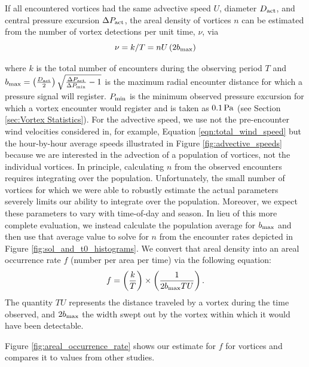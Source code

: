 \documentclass{aastex63}
\begin{document}
If all encountered vortices had the same advective speed $U$, diameter $D_{\rm act}$, and central pressure excursion $\Delta P_{\rm act}$, the areal density of vortices $n$ can be estimated from the number of vortex detections per unit time, $\nu$, via
\begin{equation}
    \nu = k/T = n U \left( 2 b_{\rm max} \right) \label{eqn:simple_number_of_encounters}
\end{equation}

where $k$ is the total number of encounters during the observing period $T$ and $b_{\rm max} = \left( \frac{D_{\rm act}}{2} \right) \sqrt{ \frac{\Delta P_{\rm act}}{\Delta P_{\rm min}} - 1 }$ is the maximum radial encounter distance for which a pressure signal will register. $P_{\rm min}$ is the minimum observed pressure excursion for which a vortex encounter would register \citep{2021Icar..35814200K} and is taken as $0.1\,{\rm Pa}$ (see Section \ref{sec:Vortex Statistics}). For the advective speed, we use not the pre-encounter wind velocities considered in, for example, Equation \ref{eqn:total_wind_speed} but the hour-by-hour average speeds illustrated in Figure \ref{fig:advective_speeds} because we are interested in the advection of a population of vortices, not the individual vortices. In principle, calculating $n$ from the observed encounters requires integrating over the population. Unfortunately, the small number of vortices for which we were able to robustly estimate the actual parameters severely limits our ability to integrate over the population.  Moreover, we expect these parameters to vary with time-of-day and season. In lieu of this more complete evaluation, we instead calculate the population average for $b_{\rm max}$ and then use that average value to solve for $n$ from the encounter rates depicted in Figure \ref{fig:sol_and_t0_histograms}. We convert that areal density into an areal occurrence rate $f$ (number per area per time)  via the following equation:
\begin{equation}
    f = \left( \frac{k}{T} \right) \times \left( \dfrac{1}{2 b_{\rm max} T U } \right).\label{eqn:convert_to_areal_occurrence_rate}
\end{equation}
The quantity $T U$ represents the distance traveled by a vortex during the time observed, and $2 b_{\rm max}$ the width swept out by the vortex within which it would have been detectable.

Figure \ref{fig:areal_occurrence_rate} shows our estimate for $f$ for vortices and compares it to values from other studies.
\end{document}

